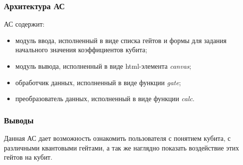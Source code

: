 \documentclass[12pt,pdf]{beamer}
\renewcommand{\~}[1]{\widetilde{#1}}
\begin{document}
  \begin{frame}
    \frametitle{Архитектура АС}
    АС содержит:
    \begin{itemize}
      \item модуль ввода, исполненный в виде списка гейтов и формы для задания
        начального значения коэффициентов кубита;
      \item модуль вывода, исполненный в виде html-элемента \emph{canvas};
      \item обработчик данных, исполненный в виде функции \emph{gate};
      \item преобразователь данных, исполненный в виде функции \emph{calc}.
    \end{itemize}
  \end{frame}

  \begin{frame}
    \frametitle{Выводы}
    Данная АС дает возможность ознакомить пользователя с понятием кубита,
    с различными квантовыми гейтами, а так же наглядно показать воздействие
    этих гейтов на кубит.
  \end{frame}
\end{document}
